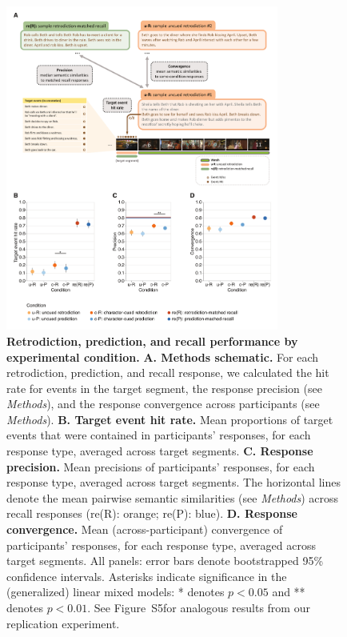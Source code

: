 \documentclass[10pt]{article}
\newcommand{\targetAsymmetries}{S5}
\begin{document}
\begin{figure}[tp]
  \centering
  \includegraphics[width=0.80\textwidth]{results1}

  \caption{\textbf{Retrodiction, prediction, and recall performance by
  experimental condition.} \textbf{A. Methods schematic.} For each
  retrodiction, prediction, and recall response, we calculated the hit rate for
  events in the target segment, the response precision (see \textit{Methods}),
  and the response convergence across participants (see \textit{Methods}).
  \textbf{B. Target event hit rate.} Mean proportions of target events that
  were contained in participants' responses, for each response type, averaged
  across target segments. \textbf{C. Response precision.} Mean precisions of
  participants' responses, for each response type, averaged across target
  segments. The horizontal lines denote the mean pairwise semantic similarities
  (see \textit{Methods}) across recall responses (re(R): orange; re(P): blue).
  \textbf{D. Response convergence.} Mean (across-participant) convergence of
  participants' responses, for each response type, averaged across target
  segments. All panels: error bars denote bootstrapped 95\% confidence
  intervals. Asterisks indicate significance in the (generalized) linear mixed
  models: * denotes $p < 0.05$ and ** denotes $p < 0.01$. See
  Figure~\targetAsymmetries for analogous results from our replication
  experiment.}

  \label{fig:result1}
\end{figure}
 
\end{document}
